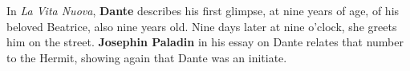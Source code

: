 In \emph{La Vita Nuova}, \textbf{Dante} describes his first glimpse, at nine years of age, of his beloved Beatrice, also nine years old. Nine days later at nine o'clock, she greets him on the street. \textbf{Josephin Paladin} in his essay on Dante relates that number to the Hermit, showing again that Dante was an initiate.



